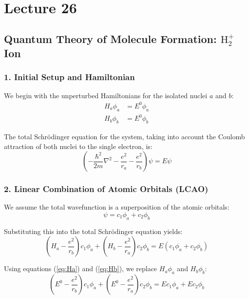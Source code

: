 \documentclass{book}
\begin{document}
\chapter{Lecture 26}
\section*{Quantum Theory of Molecule Formation: $\text{H}_2^+$ Ion}

\subsection*{1. Initial Setup and Hamiltonian}
We begin with the unperturbed Hamiltonians for the isolated nuclei $a$ and $b$:
\begin{align}
    H_a \phi_a &= E^0 \phi_a \label{eq:Ha} \\
    H_b \phi_b &= E^0 \phi_b \label{eq:Hb}
\end{align}
% 

The total Schrödinger equation for the system, taking into account the Coulomb attraction of both nuclei to the single electron, is:
\begin{equation}
    \left( -\frac{\hbar^2}{2m}\nabla^2 - \frac{e^2}{r_a} - \frac{e^2}{r_b} \right) \psi = E\psi
\end{equation}
% 

\subsection*{2. Linear Combination of Atomic Orbitals (LCAO)}
We assume the total wavefunction is a superposition of the atomic orbitals:
\begin{equation}
    \psi = c_1\phi_a + c_2\phi_b
\end{equation}
% 

Substituting this into the total Schrödinger equation yields:
\begin{equation}
    \left( H_a - \frac{e^2}{r_b} \right)c_1\phi_a + \left( H_b - \frac{e^2}{r_a} \right)c_2\phi_b = E(c_1\phi_a + c_2\phi_b)
\end{equation}
% 

Using equations (\ref{eq:Ha}) and (\ref{eq:Hb}), we replace $H_a\phi_a$ and $H_b\phi_b$:
\begin{equation}
    \left( E^0 - \frac{e^2}{r_b} \right)c_1\phi_a + \left( E^0 - \frac{e^2}{r_a} \right)c_2\phi_b = E c_1\phi_a + E c_2\phi_b
\end{equation}
\end{document}
